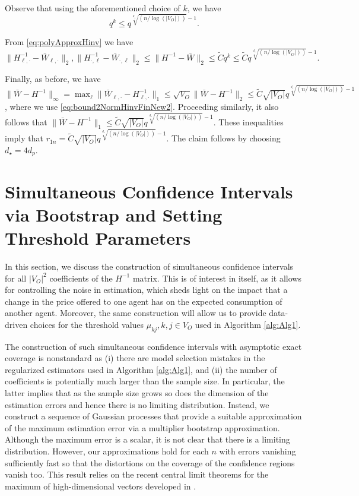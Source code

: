 \documentclass[opre,nonblindrev]{informs3} %
\newcommand{\rowdot}{\cdot}
\begin{document}
\begin{APPENDIX}{}
Observe that
using the aforementioned choice of $k$, we have
\[
q^k \leq
q^{\sqrt[d_\star]{ {(n/\log(|V_O|))} }-1}.
\]

From \eqref{eq:polyApproxHinv}
we have
\begin{equation}\label{eq:bound2NormHinvFinNew2}
\| H^{-1}_{\ell ,\rowdot}-\bar{W}_{\ell,\rowdot} \|_2,
\| H^{-1}_{\rowdot,\ell}-\bar{W}_{\rowdot,\ell} \|_2
\leq  \|
H^{-1} - \bar{W}\|_2
\leq
\tilde{C}
q^k
\leq
\tilde{C}
q^{\sqrt[d_\star]{ {(n/\log(|V_O|))} }-1}.
\end{equation}

Finally,
as before, we have
$\| \bar{W}  - H^{-1}\|_\infty=\max_\ell \| \bar{W}_{\ell ,\rowdot}  - H_{\ell ,\rowdot}^{-1}\|_1  \leq  \sqrt{V_O} \| \bar{W}  - H^{-1}\|_2 \leq \tilde{C} \sqrt{|V_O|}
q^{\sqrt[d_\star]{ {(n/\log(|V_O|))} }-1}
$, where we use \eqref{eq:bound2NormHinvFinNew2}.
Proceeding similarly, it also follows that
$\| \bar{W}  - H^{-1}\|_1 \leq
\tilde{C} \sqrt{|V_O|}
q^{\sqrt[d_\star]{ {(n/\log(|V_O|))} }-1}$.
These  inequalities  imply that
$r_{1n}=
\tilde{C}
{\sqrt{|V_O|}}
q^{\sqrt[d_\star]{ {(n/\log(|V_O|))} }-1}
$.
The claim follows by choosing $d_\star=4 d_p$.
\hfill \halmos \endproof


\section{Simultaneous Confidence Intervals via Bootstrap and Setting Threshold Parameters}\label{Sec:SimultaneousBootstrap}

In this section, we discuss the construction of simultaneous confidence intervals for all $|V_O|^2$ coefficients of the $H^{-1}$ matrix. This is of interest in itself, as it allows for  controlling the noise in  estimation,
	which sheds light on the  impact 
	that a change in the price offered to 
	one agent has on the expected consumption of another agent. 
	 Moreover, the same construction will allow us to provide data-driven choices for the threshold values $\mu_{kj}, k,j \in V_O$ used in Algorithm \ref{alg:Alg1}.
	
	
	The construction of such simultaneous confidence intervals with asymptotic exact coverage is nonstandard as (i) there are model selection mistakes in the regularized estimators used in Algorithm \ref{alg:Alg1}, and (ii) the number of coefficients is potentially much larger than the sample size. In particular, the latter implies that as the sample size grows so does the dimension of the estimation errors and hence there is no limiting distribution. Instead, we construct a sequence of Gaussian processes that provide a suitable approximation of the maximum estimation error via a multiplier bootstrap approximation. Although the maximum error is a scalar, it is not clear that there is a limiting distribution. However, our approximations hold for each $n$ with errors vanishing sufficiently fast so that the distortions on the coverage of the confidence regions vanish too. This result relies on the recent central limit theorems for the maximum of high-dimensional vectors developed in \cite{chernozhukov2012gaussian,chernozhukov2012comparison,chernozhukov2013gaussian,chernozhukov2014honestbands}.
	



\end{APPENDIX}
\end{document}
